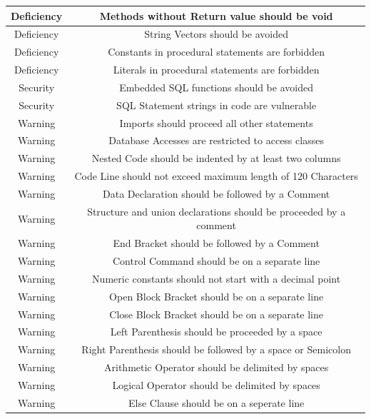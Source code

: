 \documentclass[da,ngerman]{stthesis}
\begin{document}
\begin{center}
\begin{longtabu}{|c|c|}
						\hline
						Deficiency & Methods without Return value should be void \\
						\hline
						Deficiency & String Vectors should be avoided \\
						\hline
						Deficiency & Constants in procedural statements are forbidden \\
						\hline
						Deficiency & Literals in procedural statements are forbidden \\
						\hline
						Security & Embedded SQL functions should be avoided \\
						\hline
						Security & SQL Statement strings in code are vulnerable \\
						\hline
						Warning & Imports should proceed all other statements \\
						\hline
						Warning & Database Accesses are restricted to access classes \\
						\hline
						Warning & Nested Code should be indented by at least two columns \\
						\hline
						Warning & Code Line should not exceed maximum length of 120 Characters \\
						\hline
						Warning & Data Declaration should be followed by a Comment \\
						\hline
						Warning & Structure and union declarations should be proceeded by a comment \\
						\hline
						Warning & End Bracket should be followed by a Comment \\
						\hline
						Warning & Control Command should be on a separate line \\
						\hline
						Warning & Numeric constants should not start with a decimal point \\
						\hline
						Warning & Open Block Bracket should be on a separate line \\
						\hline
						Warning & Close Block Bracket should be on a separate line \\
						\hline
						Warning & Left Parenthesis should be proceeded by a space \\
						\hline
						Warning & Right Parenthesis should be followed by a space or Semicolon \\
						\hline
						Warning & Arithmetic Operator should be delimited by spaces \\
						\hline
						Warning & Logical Operator should be delimited by spaces \\
						\hline
						Warning & Else Clause should be on a seperate line \\

\end{longtabu}
\end{center}
\end{document}
